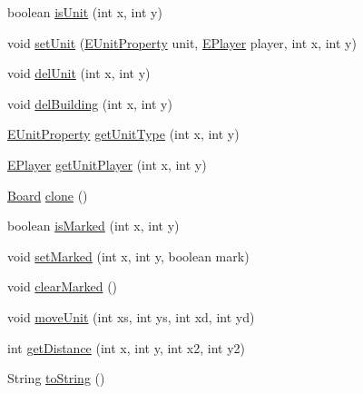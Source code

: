 \begin{DoxyCompactItemize}
boolean \mbox{\hyperlink{classgame_1_1board_1_1_board_aed65bda6e81b3ddbc14fa80bd52ac992}{is\+Unit}} (int x, int y)
\item 
void \mbox{\hyperlink{classgame_1_1board_1_1_board_a9432da1a143c35864052234c09acec09}{set\+Unit}} (\mbox{\hyperlink{enumrule_engine_1_1entity_1_1_e_unit_property}{E\+Unit\+Property}} unit, \mbox{\hyperlink{enumgame_1_1_e_player}{E\+Player}} player, int x, int y)
\item 
void \mbox{\hyperlink{classgame_1_1board_1_1_board_a580af354baf71be5405e6876dd78e3f6}{del\+Unit}} (int x, int y)
\item 
void \mbox{\hyperlink{classgame_1_1board_1_1_board_a2887ad41696ae6aeafc9494ca80f465b}{del\+Building}} (int x, int y)
\item 
\mbox{\hyperlink{enumrule_engine_1_1entity_1_1_e_unit_property}{E\+Unit\+Property}} \mbox{\hyperlink{classgame_1_1board_1_1_board_a86eddc47b7951c2e74f9acfb5d8ad2e1}{get\+Unit\+Type}} (int x, int y)
\item 
\mbox{\hyperlink{enumgame_1_1_e_player}{E\+Player}} \mbox{\hyperlink{classgame_1_1board_1_1_board_a4290038dfff8b88ab1e95a96f5d083b9}{get\+Unit\+Player}} (int x, int y)
\item 
\mbox{\hyperlink{classgame_1_1board_1_1_board}{Board}} \mbox{\hyperlink{classgame_1_1board_1_1_board_a9c451f4c61b310a98999f4d6968bc6e1}{clone}} ()
\item 
boolean \mbox{\hyperlink{classgame_1_1board_1_1_board_af3a3c94fbe601ba799bfe105e0630be6}{is\+Marked}} (int x, int y)
\item 
void \mbox{\hyperlink{classgame_1_1board_1_1_board_a22008b95ac8e2754713eaebac4622ac4}{set\+Marked}} (int x, int y, boolean mark)
\item 
void \mbox{\hyperlink{classgame_1_1board_1_1_board_acf5718b00471ceacee5182f1a214f124}{clear\+Marked}} ()
\item 
void \mbox{\hyperlink{classgame_1_1board_1_1_board_a86ad52885974bcca106abcbcf7e3c965}{move\+Unit}} (int xs, int ys, int xd, int yd)
\item 
int \mbox{\hyperlink{classgame_1_1board_1_1_board_a169a1f68a5c996127f2f762551405026}{get\+Distance}} (int x, int y, int x2, int y2)
\item 
String \mbox{\hyperlink{classgame_1_1board_1_1_board_aef2fb3bb74281bbc59a9f2f7c1603141}{to\+String}} ()
\end{DoxyCompactItemize}
